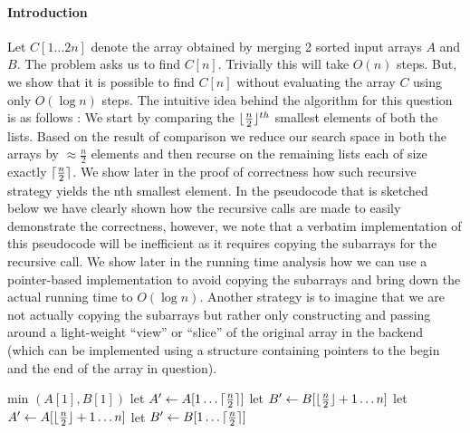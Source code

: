 \documentclass[answers]{exam}
\begin{document}
\begin{questions}
\DeclarePairedDelimiter\ceil{\lceil}{\rceil}
\DeclarePairedDelimiter\floor{\lfloor}{\rfloor}

\begin{solution}

\paragraph{Introduction} Let $C[1 \ldots 2n]$ denote the array obtained by merging 2 sorted input arrays $A$ and $B$. The problem asks us to find $C[n]$. Trivially this will take $O(n)$ steps. But, we show that it is possible to find $C[n]$ without evaluating the array $C$ using only $O(\log n)$ steps. The intuitive idea behind the algorithm for this question is as follows : We start by comparing the $\floor{\frac{n}{2}}^{th}$ smallest elements of both the lists. Based on the result of comparison we reduce our search space in both the arrays by $\approx \frac{n}{2}$ elements and then recurse on the remaining lists each of size exactly $\ceil {\frac{n}{2}}$. We show later in the proof of correctness how such recursive strategy yields the nth smallest element. In the pseudocode that is sketched below we have clearly shown how the recursive calls are made to easily demonstrate the correctness, however, we note that a verbatim implementation of this pseudocode will be inefficient as it requires copying the subarrays for the recursive call. We show later in the running time analysis how we can use a pointer-based implementation to avoid copying the subarrays and bring down the actual running time to $O(\log n)$. Another strategy is to imagine that we are not actually copying the subarrays but rather only constructing and passing around a light-weight ``view'' or ``slice'' of the original array in the backend (which can be implemented using a structure containing pointers to the begin and the end of the array in question).

\begin{algorithmic}[1]
    \State \Return min $(A[1], B[1])$
\EndIf
{}
    \State let $A' \gets A[1 \ldots \ceil{\frac{n}{2}}]$ 
    \State let $B' \gets B[\floor{\frac{n}{2}} + 1 \ldots n]$
\Else
    \State let $A' \gets A[\floor{\frac{n}{2}} + 1 \ldots n]$ 
    \State let $B' \gets B[1 \ldots \ceil{\frac{n}{2}}]$
\EndIf
\State \Return {}
\EndFunction
\end{algorithmic}


\end{solution}
\end{questions}
\end{document}
